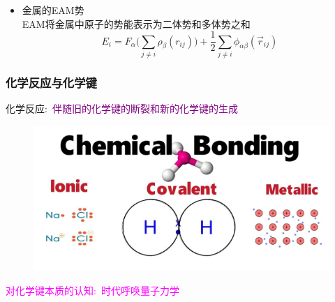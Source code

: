{\begin{itemize}
{{\begin{figure}[h!]
\caption{\tiny \textrm{The Morse potential (blue) and harmonic oscillator potential (green).}}%
\label{Potential-Morse}
\end{figure}
}}
\item 金属的\textrm{EAM}势\\
	{\fontsize{9.5pt}{6.2pt}
	\vskip 2pt
	\textrm{EAM}将金属中原子的势能表示为二体势和多体势之和
	\begin{displaymath}
		E_i=F_{\alpha}\bigg(\sum_{j\neq i}\rho_{\beta}(r_{ij})\bigg)+\dfrac12\sum_{j\neq i}\phi_{\alpha\beta}(\vec r_{ij})
	\end{displaymath}}
	{\fontsize{7.2pt}{6.2pt}}
	\vskip 1pt
	{\fontsize{8.5pt}{6.2pt}}
	\end{itemize}
}

\frame
{
	\frametitle{化学反应与化学键}
化学反应:~\textcolor{purple}{伴随旧的化学键的断裂和新的化学键的生成}
\begin{figure}[h!]
\centering
\includegraphics[height=0.50\textwidth,width=1.0\textwidth,viewport=0 0 580 280,clip]{Figures/Chemical_Bonding.jpg}
\label{Chemical_Bond-2}
\end{figure}
{\centering\textcolor{magenta}{对化学键本质的认知:~时代呼唤量子力学}}
}


